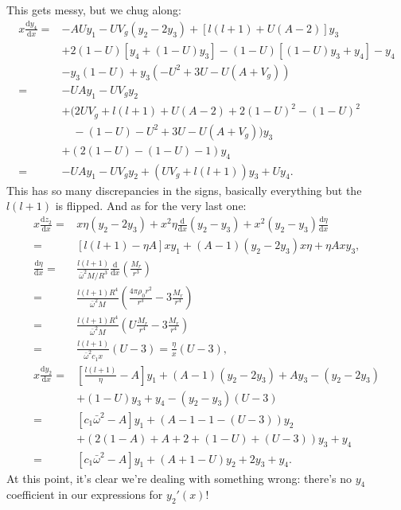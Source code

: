 \documentclass[11pt,
        usenames, %
        twocolumn,
        landscape,
        dvipsnames %
    ]{article}
\newcommand*{\rd}[2]{\frac{\mathrm{d}#1}{\mathrm{d}#2}}
\newcommand*{\p}[1]{\left(#1\right)}
\newcommand*{\s}[1]{\left[#1\right]}
\begin{document}
This gets messy, but we chug along:
\begin{align}
    x\rd{y_4}{x} ={}&
            - AUy_1
            - UV_g(y_2 - 2y_3)
            + \s{l(l+1) + U(A - 2)}y_3\nonumber\\
            &+ 2(1 - U)\s{y_4 + (1 - U)y_3}
            - (1 - U)\s{(1 - U)y_3 + y_4}
            - y_4\nonumber\\
            &- y_3(1 - U)
            + y_3\p{-U^2 + 3U - U(A + V_g)}\nonumber\\
        ={}& -UAy_1
            -UV_g y_2\nonumber\\
            &+ \Big(2UV_g + l(l+1) + U(A - 2)
                + 2(1 - U)^2 - (1 - U)^2\nonumber\\
            &\quad- (1 - U) - U^2 + 3U - U(A + V_g)\Big)y_3\nonumber\\
            &+ \p{2(1 - U) - (1 - U) - 1}y_4\nonumber\\
        ={}& -UAy_1 -UV_g y_2 + \p{UV_g + l(l+1)}y_3 + Uy_4.
\end{align}
This has so many discrepancies in the signs, basically everything but the
$l(l+1)$ is flipped. And as for the very last one:
\begin{align}
    x\rd{z_2}{x}
        ={}&
        x\eta (y_2 - 2y_3)
        + x^2\eta\rd{}{x}(y_2 - y_3)
        + x^2(y_2 - y_3)\rd{\eta}{x}\nonumber\\
        ={}& \s{l(l+1) - \eta A}xy_1
            + (A - 1)(y_2 - 2y_3)x\eta
            + \eta Axy_3,\nonumber\\
    \rd{\eta}{x} ={}& \frac{l(l+1)}{\bar{\omega}^2M/R^3}
            \rd{}{x}\p{\frac{M_r}{r^3}}\nonumber\\
        ={}& \frac{l(l+1)R^4}{\bar{\omega}^2M}
            \p{\frac{4\pi \rho_0 r^2}{r^3}
                - 3\frac{M_r}{r^4}}\nonumber\\
        ={}& \frac{l(l+1)R^4}{\bar{\omega}^2M}
            \p{U\frac{M_r}{r^4} - 3\frac{M_r}{r^4}}\nonumber\\
        ={}& \frac{l(l+1)}{\bar{\omega}^2c_1x}(U - 3) = \frac{\eta}{x}(U - 3)
            ,\nonumber\\
    x\rd{y_2}{x}
        ={}& \s{\frac{l(l+1)}{\eta} - A}y_1
                + (A - 1)(y_2 - 2y_3)
                + Ay_3
                - (y_2 - 2y_3)\nonumber\\
            &+ (1 - U)y_3 + y_4
                - \p{y_2 - y_3}(U - 3)\nonumber\\
        ={}& \s{c_1\bar{\omega}^2 - A}y_1
                + \p{A - 1 - 1 - (U - 3)}y_2\nonumber\\
            &+ \p{2(1 - A) + A + 2 + (1 - U) + (U - 3)}y_3 + y_4\nonumber\\
        ={}& \s{c_1\bar{\omega}^2 - A}y_1
                + \p{A + 1 - U}y_2 + 2y_3 + y_4.
\end{align}
At this point, it's clear we're dealing with something wrong: there's no $y_4$
coefficient in our expressions for $y_2'(x)$!
\end{document}
